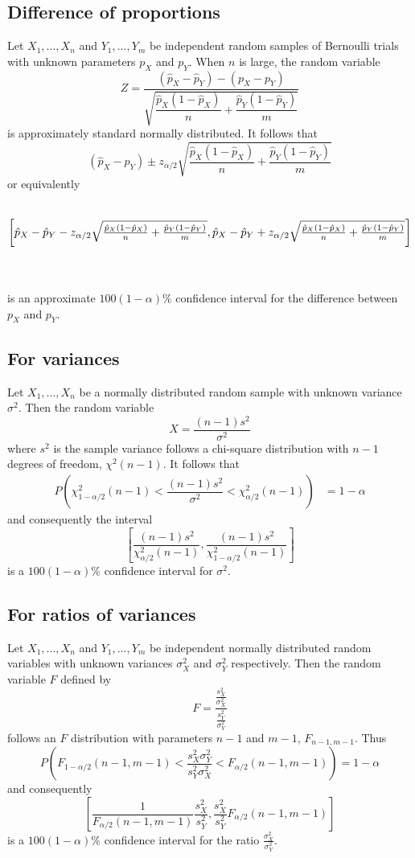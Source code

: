 \documentclass[1pt]{report}
\newcommand{\<}{\langle}
\renewcommand{\>}{\rangle}
\begin{document}
\subsection{Difference of proportions}
Let $X_1,\dots, X_n$ and $Y_1,\dots, Y_m$ be independent random samples of Bernoulli trials with unknown parameters $p_X$ and $p_Y$. When $n$ is large, the random variable
$$ Z = \dfrac{ (\hat p_X - \hat p_Y) - (p_X - p_Y)}{\sqrt{\dfrac{\hat p_X(1 -\hat p_X)}{n} + \dfrac{\hat p_Y (1 - \hat p_Y)}{m}}}$$
is approximately standard normally distributed. It follows that
$$ (\hat p_X - \hat p_Y) \pm z_{\alpha/2} \sqrt{\frac{\hat p_X(1-\hat p_X)}{n} + \frac{\hat p_Y( 1- \hat p_Y)}{m}}$$
or equivalently\\
\\
\centerline {
$$\resizebox{1.2\textwidth}{!}{$\left[ \hat p_X - \hat p_Y - z_{\alpha/2}\sqrt{\tfrac{\hat p_X(1-\hat p_X)}{n} + \tfrac{\hat p_Y (1-\hat p_Y)}{m}} , \hat p_X - \hat p_Y + z_{\alpha/2} \sqrt{\tfrac{\hat p_X (1-\hat p_X)}{n} + \tfrac{\hat p_Y(1-\hat p_Y)}{m}}\right]$}$$}\\
\\
is an approximate $100(1-\alpha)\%$ confidence interval for the difference between $p_X$ and $p_Y$.
\subsection{For variances}
Let $X_1, \dots, X_n$ be a normally distributed random sample with unknown variance $\sigma^2$. Then the random variable
$$X = \dfrac{(n-1)s^2}{\sigma^2}$$
where $s^2$ is the sample variance follows a chi-square distribution with $n-1$ degrees of freedom, $\chi^2(n-1)$. It follows that
\begin{align*}
P\left(\chi^2_{1-\alpha/2}(n-1) < \dfrac{ (n-1)s^2}{\sigma^2} < \chi^2_{\alpha/2}(n-1)\right) & = 1 - \alpha
\end{align*}
and consequently the interval
$$\left[ \frac{(n-1)s^2}{\chi^2_{\alpha/2}(n-1)} , \frac{(n-1)s^2}{\chi^2_{1-\alpha/2}(n-1)}\right]$$
is a $100(1-\alpha)\%$ confidence interval for $\sigma^2$.
\subsection{For ratios of variances}
Let $X_1, \dots , X_n$ and $Y_1, \dots, Y_m$ be independent normally distributed random variables with unknown variances $\sigma_X^2$ and $\sigma_Y^2$ respectively. Then the random variable $F$ defined by
$$F = \dfrac{\frac{s_X^2}{\sigma_X^2}}{\frac{s_Y^2}{\sigma_Y^2}}$$
follows an $F$ distribution with parameters $n-1$ and $m-1$, $F_{n-1, m-1}$. Thus
$$P\left( F_{1-\alpha/2}(n-1, m-1) < \dfrac{s_X^2 \sigma_Y^2}{s_Y^2 \sigma_X^2} < F_{\alpha/2}(n-1,m-1)\right) = 1-\alpha$$
and consequently
$$\left[ \dfrac{1}{F_{\alpha/2}(n-1,m-1)}\dfrac{s_X^2}{s_Y^2} , \dfrac{s_X^2}{s_Y^2} F_{\alpha/2}(n-1,m-1)\right]$$
is a $100(1-\alpha)\%$ confidence interval for the ratio $\frac{\sigma_X^2}{\sigma_Y^2}$.
\end{document}
